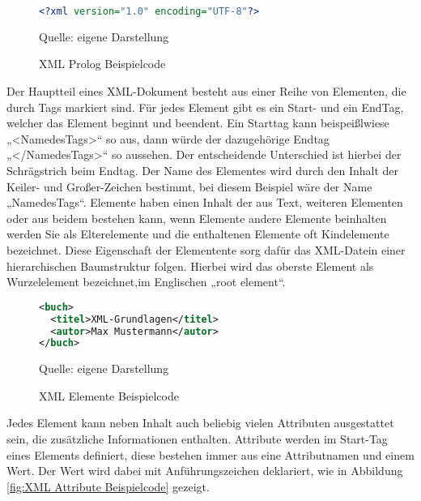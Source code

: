 \begin{figure}[H]
\centering
\begin{minipage}{0.95\textwidth}
\begin{lstlisting}[language=XML]
<?xml version="1.0" encoding="UTF-8"?>
\end{lstlisting}
\end{minipage}
\caption{XML Prolog Beispielcode}
\label{fig:XML Prolog Beispielcode}
    {Quelle: eigene Darstellung}
\end{figure}


Der Hauptteil eines \ac{XML}-Dokument besteht aus einer Reihe von Elementen, die durch Tags markiert sind.
Für jedes Element gibt es ein Start- und ein EndTag, welcher das Element beginnt und beendent.
Ein Starttag kann beispeißlwiese „<NamedesTags>“ so aus, dann würde der dazugehörige Endtag „</NamedesTags>“ so aussehen.
Der entscheidende Unterschied ist hierbei der Schrägstrich beim Endtag.
Der Name des Elementes wird durch den Inhalt der Keiler- und Großer-Zeichen bestimmt, bei diesem Beispiel wäre der Name „NamedesTags“.
Elemente haben einen Inhalt der aus Text, weiteren Elementen oder aus beidem bestehen kann,
wenn Elemente andere Elemente beinhalten werden Sie als Elterelemente und die enthaltenen Elemente oft Kindelemente bezeichnet.
Diese Eigenschaft der Elementente sorg dafür das XML-Datein einer hierarchischen Baumstruktur folgen.
Hierbei wird das oberste Element als Wurzelelement bezeichnet,im Englischen „root element“.\cite*[10-14]{Becher2022}


\begin{figure}[H]
\centering
\begin{minipage}{0.95\textwidth}
\begin{lstlisting}[language=XML]
<buch>
  <titel>XML-Grundlagen</titel>
  <autor>Max Mustermann</autor>
</buch>
\end{lstlisting}
\end{minipage}
\caption{XML Elemente Beispielcode}
\label{fig:XML Elemente Beispielcode}
    {Quelle: eigene Darstellung}
\end{figure}

Jedes Element kann neben Inhalt auch beliebig vielen Attributen ausgestattet sein, die zusätzliche Informationen enthalten.
Attribute werden im Start-Tag eines Elements definiert, diese bestehen immer aus eine Attributnamen und einem Wert.
Der Wert wird dabei mit Anführungszeichen deklariert, wie in Abbildung \ref{fig:XML Attribute Beispielcode} gezeigt. \cite*[10-14]{Becher2022}

